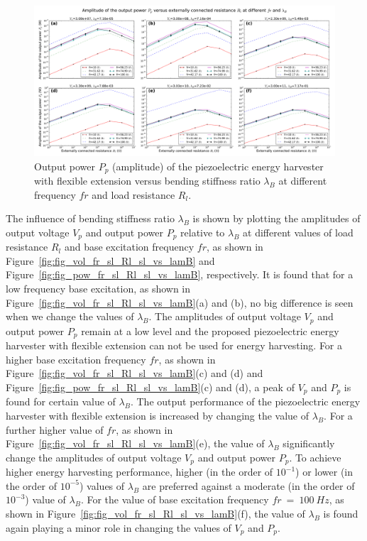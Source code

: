 \documentclass{elsarticle}
\begin{document}
\begin{figure}[!htbp]
    \centering
    \includegraphics[width=\textwidth]{./fig_pow_lamB_list_vs_fr_Rl}
    \caption{Output power $P_p$ (amplitude) of the piezoelectric energy harvester with flexible extension versus bending stiffness ratio $\lambda_B$ at different frequency $fr$ and load resistance $R_l$.  \color{red}{to be revised in the legend. change figure title} }
    \label{fig:fig_pow_lamB_list_vs_fr_Rl}
\end{figure}


The influence of bending stiffness ratio $\lambda_B$ is shown by plotting the amplitudes of output voltage $V_p$ and output power $P_p$ relative to $\lambda_B$ at different values of load resistance $R_l$ and base excitation frequency $fr$, as shown in Figure~\ref{fig:fig_vol_fr_sl_Rl_sl_vs_lamB} and Figure~\ref{fig:fig_pow_fr_sl_Rl_sl_vs_lamB}, respectively. It is found that for a low frequency base excitation, as shown in Figure~\ref{fig:fig_vol_fr_sl_Rl_sl_vs_lamB}(a) and (b), no big difference is seen when we change the values of $\lambda_B$. The amplitudes of output voltage $V_p$ and output power $P_p$ remain at a low level and the proposed piezoelectric energy harvester with flexible extension can not be used for energy harvesting. For a higher base excitation frequency $fr$, as shown in Figure~\ref{fig:fig_vol_fr_sl_Rl_sl_vs_lamB}(c) and (d) and Figure~\ref{fig:fig_pow_fr_sl_Rl_sl_vs_lamB}(c) and (d), a peak of $V_p$ and $P_p$ is found for certain value of $\lambda_B$. The output performance of the piezoelectric energy harvester with flexible extension is increased by changing the value of $\lambda_B$. For a further higher value of $fr$, as shown in Figure~\ref{fig:fig_vol_fr_sl_Rl_sl_vs_lamB}(e), the value of $\lambda_B$ significantly change the amplitudes of output voltage $V_p$ and output power $P_p$. To achieve higher energy harvesting performance, higher (in the order of $10^{-1}$) or lower (in the order of $10^{-5}$) values of $\lambda_B$ are preferred against a moderate (in the order of $10^{-3}$) value of $\lambda_B$. For the value of base excitation frequency $fr\ =\ 100\ Hz$, as shown in Figure~\ref{fig:fig_vol_fr_sl_Rl_sl_vs_lamB}(f), the value of $\lambda_B$ is found again playing a minor role in changing the values of $V_p$ and $P_p$.
\end{document}
